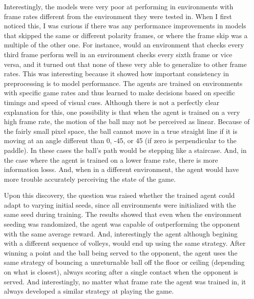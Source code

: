 \documentclass[12pt, a4paper, twocolumn]{article} %
\begin{document}
Interestingly, the models were very poor at performing in environments with frame rates different from the environment they were tested in. When I first noticed this, I was curious if there was any performance improvements in models that skipped the same or different polarity frames, or where the frame skip was a multiple of the other one. For instance, would an environment that checks every third frame perform well in an environment checks every sixth frame or vice versa, and it turned out that none of these very able to generalize to other frame rates. This was interesting because it showed how important consistency in preprocessing is to model performance. The agents are trained on environments with specific game rates and thus learned to make decisions based on specific timings and speed of visual cues. Although there is not a perfectly clear explanation for this, one possibility is that when the agent is trained on a very high frame rate, the motion of the ball may not be perceived as linear. Because of the fairly small pixel space, the ball cannot move in a true straight line if it is moving at an angle different than 0, -45, or 45 (if zero is perpendicular to the paddle). In these cases the ball's path would be stepping like a staircase. And, in the case where the agent is trained on a lower frame rate, there is more information losss. And, when in a different environment, the agent would have more trouble accurately perceiving the state of the game. 

Upon this discovery, the question was raised whether the trained agent could adapt to varying initial seeds, since all environments were initialized with the same seed during training. The results showed that even when the environment seeding was randomized, the agent was capable of outperforming the opponent with the same average reward. And, interestingly the agent although begining with a different sequence of volleys, would end up using the same strategy. After winning a point and the ball being served to the opponent, the agent uses the same strategy of bouncing a unreturnable ball off the floor or ceiling (depending on what is closest), always scoring after a single contact when the opponent is served. And interestingly, no matter what frame rate the agent was trained in, it always developed a similar strategy at playing the game. 




\printbibliography[title={Bibliography}] %

\end{document}

